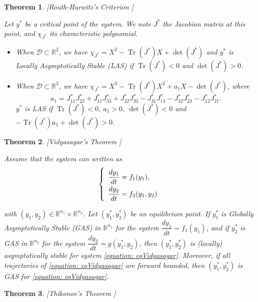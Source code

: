 \documentclass{article}
\DeclareMathOperator{\Tr}{Tr}
\newtheorem{theorem}{Theorem}
\theoremstyle{definition}
\theoremstyle{remark}
\begin{document}
\begin{appendix}
\begin{theorem} \label{theorem:Routh-Hurwitz} [Routh-Hurwitz's Criterion \cite{wiggins_introduction_2003}]

Let $y^*$ be a critical point of the system. We note $J^*$ the Jacobian matrix at this point, and $\chi_{J^*}$ its characteristic polynomial.

\begin{itemize}
\item When $\mathcal{D}\subset \mathbb{R}^2$, we have $\chi_{J^*} = X^2 - \Tr(J^*) X + \det(J^*)$ and $y^*$ is Locally Asymptotically Stable (LAS) if $\Tr(J^*) < 0$ and $\det(J^*) > 0$.
\item When $\mathcal{D}\subset \mathbb{R}^3$, we have $\chi_{J^*} = X^3 - \Tr(J^*) X^2 + a_1 X - \det(J^*)$, where $$a_1 = J^*_{11}J^*_{22} + J^*_{11} J^*_{33} + J^*_{22}J^*_{33} - J^*_{31}J^*_{13} - J^*_{32}J^*_{23} - J^*_{12}J^*_{21}.$$  $y^*$ is LAS if $\Tr(J^*) < 0$, $a_1 > 0$, $\det(J^*) < 0$ and $-\Tr(J^*) a_1 + \det(J^*) > 0$.
\end{itemize}
\end{theorem}

\begin{theorem} \label{theorem:Vidyasagar} [Vidyasagar's Theorem  \cite{vidyasagar_decomposition_1980, dumont_mathematical_2012}]

Assume that the system can written as
\begin{equation}
\def\arraystretch{2}
\left\{ \begin{array}{l}
\dfrac{dy_1}{dt} = f_1(y_1), \\
\dfrac{dy_2}{dt} = f_2(y_1, y_2) 
\end{array} \right.
\label{equation: eqVidyasagar}
\end{equation}

with $(y_1, y_2) \in \mathbb{R}^{n_1} \times\mathbb{R}^{n_2}$. Let $(y_1^*, y^*_2)$ be an equilibrium point.
If $y^*_1$ is Globally Asymptotically Stable (GAS) in $\mathbb{R}^{n_1}$ for the system $\dfrac{dy_1}{dt} = f_1(y_1)$, and if $y^*_2$ is GAS in $\mathbb{R}^{n_2}$ for the system $\dfrac{dy_2}{dt} = g(y_1^*, y_2)$, then $(y_1^*, y_2^*)$ is (locally) asymptotically stable for system \eqref{equation: eqVidyasagar}. Moreover, if all trajectories of \eqref{equation: eqVidyasagar} are forward bounded, then $(y_1^*, y_2^*)$ is GAS for \eqref{equation: eqVidyasagar}.
\end{theorem}

\begin{theorem} \label{theorem:Tikhonov} [Thikonov's Theorem \cite{banasiak_methods_2014}]


\end{theorem}
\end{appendix}
\end{document}
